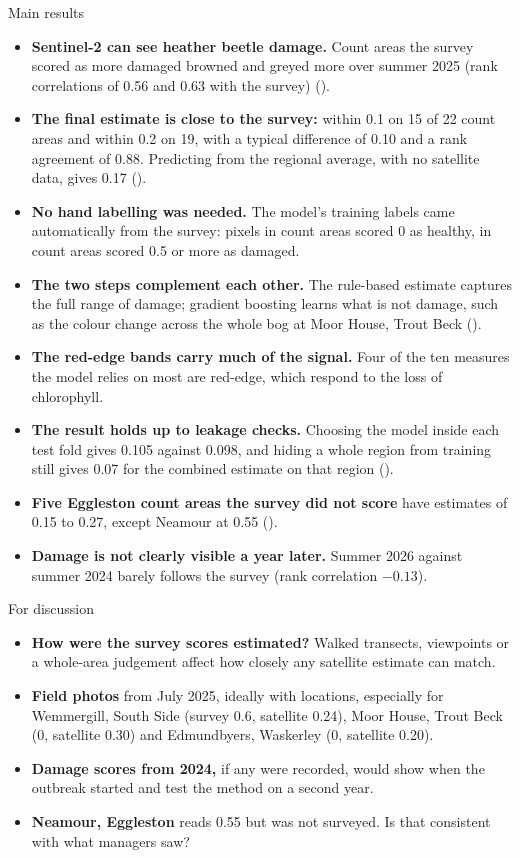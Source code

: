 \documentclass[11pt,a4paper]{article}
\begin{document}
\begin{keybox}{Main results}
\begin{itemize}
\item \textbf{Sentinel-2 can see heather beetle damage.} Count areas the survey scored as more damaged browned and greyed more over summer 2025 (rank correlations of 0.56 and 0.63 with the survey) ().
\item \textbf{The final estimate is close to the survey:} within 0.1 on 15 of 22 count areas and within 0.2 on 19, with a typical difference of 0.10 and a rank agreement of 0.88. Predicting from the regional average, with no satellite data, gives 0.17 ().
\item \textbf{No hand labelling was needed.} The model's training labels came automatically from the survey: pixels in count areas scored 0 as healthy, in count areas scored 0.5 or more as damaged.
\item \textbf{The two steps complement each other.} The rule-based estimate captures the full range of damage; gradient boosting learns what is not damage, such as the colour change across the whole bog at Moor House, Trout Beck ().
\item \textbf{The red-edge bands carry much of the signal.} Four of the ten measures the model relies on most are red-edge, which respond to the loss of chlorophyll.
\item \textbf{The result holds up to leakage checks.} Choosing the model inside each test fold gives 0.105 against 0.098, and hiding a whole region from training still gives 0.07 for the combined estimate on that region ().
\item \textbf{Five Eggleston count areas the survey did not score} have estimates of 0.15 to 0.27, except Neamour at 0.55 ().
\item \textbf{Damage is not clearly visible a year later.} Summer 2026 against summer 2024 barely follows the survey (rank correlation $-0.13$).
\end{itemize}
\end{keybox}

\begin{keybox}{For discussion}
\begin{itemize}
\item \textbf{How were the survey scores estimated?} Walked transects, viewpoints or a whole-area judgement affect how closely any satellite estimate can match.
\item \textbf{Field photos} from July 2025, ideally with locations, especially for Wemmergill, South Side (survey 0.6, satellite 0.24), Moor House, Trout Beck (0, satellite 0.30) and Edmundbyers, Waskerley (0, satellite 0.20).
\item \textbf{Damage scores from 2024,} if any were recorded, would show when the outbreak started and test the method on a second year.
\item \textbf{Neamour, Eggleston} reads 0.55 but was not surveyed. Is that consistent with what managers saw?
\end{itemize}
\end{keybox}
\end{document}
